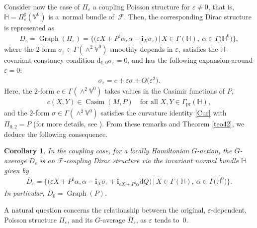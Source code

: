\documentclass[10pt,a4paper]{amsart}
\numberwithin{equation}{section}
\newtheorem{Corollary}[Theorem]{Corollary}
\begin{document}
Consider now the case of $\Pi_{\varepsilon}$ a coupling Poisson structure for $\varepsilon\neq0$, that is, $\mathbb{H}= \Pi_{\varepsilon}^{\sharp}(\mathbb{V}^{0})$ is a~normal bundle of~$\mathcal{F}$. Then, the corresponding Dirac structure is represented as
\begin{gather*}
D_{\varepsilon}=\operatorname*{Graph}(\Pi_{\varepsilon})=\big\{\big(\varepsilon
X+P^{\sharp}\alpha,\alpha-\mathbf{i}_{X}\sigma_{\varepsilon}\big)\,|\, X\in \Gamma(\mathbb{H}),\ \alpha\in\Gamma\big(\mathbb{H}^{0}\big)\big\},
\end{gather*}
where the $2$-form $\sigma_{\varepsilon}\in\Gamma(\wedge^{2}\mathbb{V}^{0})$ smoothly depends in $\varepsilon$, satisf\/ies the $\mathbb{H}$-covariant constancy condition $\mathrm{d}_{1,0}\sigma_{\varepsilon}=0$, and has the following expansion around $\varepsilon=0$:
\begin{gather*}%
\sigma_{\varepsilon}=c+\varepsilon\sigma+O\big(\varepsilon^{2}\big).
\end{gather*}
Here, the $2$-form $c\in\Gamma(\wedge^{2}\mathbb{V}^{0})$ takes values in the Casimir functions of $P$,
\begin{gather*}
c(X,Y)\in\operatorname*{Casim}(M,P)\quad \mbox{for all }X,Y\in\Gamma_{\operatorname*{pr}}(\mathbb{H}),
\end{gather*}
and the $2$-form $\sigma\in\Gamma(\wedge^{2}\mathbb{V}^{0})$ satisf\/ies the curvature identity \eqref{Cur} with $\Pi_{0,2}=P$ (for more details, see \cite{Va-04,JVYV-14}). From these remarks and Theorem \ref{teo42}, we deduce the following consequence.

\begin{Corollary}
In the coupling case, for a locally Hamiltonian $G$-action, the $G$-average $\overline{D}_{\varepsilon}$ is an $\mathcal{F}$-coupling Dirac structure via the invariant normal bundle $\mathbb{\bar{H}}$ given by
\begin{gather*}
\overline{D}_{\varepsilon}=\big\{\big(\varepsilon X+P^{\sharp}\alpha,\alpha-\mathbf{i}
_{X}\sigma_{\varepsilon}+\mathbf{i}_{\varepsilon X+P^{\sharp}\alpha}\mathrm{d}Q\big)\,|\,
X\in\Gamma(\mathbb{H}),\ \alpha\in\Gamma\big(\mathbb{H}^{0}\big)\big\}.
\end{gather*}
In particular, $\overline{D}_{0}=\operatorname*{Graph}(P)$.
\end{Corollary}

A natural question concerns the relationship between the original, $\varepsilon$-dependent, Poisson structure $\Pi_{\varepsilon}$, and its $G$-average $\overline{\Pi}_{\varepsilon}$, as $\varepsilon$ tends to~$0$.
\end{document}
